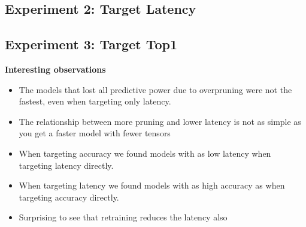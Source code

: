 \documentclass[../Dissertation.tex]{subfiles}
\begin{document}
\subsection{Experiment 2: Target Latency}

\subsection{Experiment 3: Target Top1}

\textbf{Interesting observations}
\begin{itemize}
    \item The models that lost all predictive power due to overpruning were not the fastest, even when targeting only latency.
    \item The relationship between more pruning and lower latency is not as simple as you get a faster model with fewer tensors
    \item When targeting accuracy we found models with as low latency when targeting latency directly.
    \item When targeting latency we found models with as high accuracy as when targeting accuracy directly.
    \item Surprising to see that retraining reduces the latency also
\end{itemize}
\end{document}
